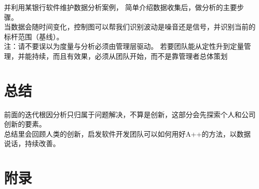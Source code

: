 \documentclass{book}        %
\begin{document}
并利用某银行软件维护数据分析案例， 简单介绍数据收集后，做分析的主要步骤。\\

当数据会随时间变化，控制图可以帮我们识别波动是噪音还是信号，并识别当前的标杆范围（基线）。\\

注：请不要误以为度量与分析必须由管理层驱动。 若要团队能从定性升到定量管理，并能持续，而且有效果，必须从团队开始，而不是靠管理者总体策划 \\










\part{总结} 前面的迭代根因分析只归属于问题解决，不算是创新，这部分会先探索个人和公司创新的要素。\\
总结里会回顾人类的创新，启发软件开发团队可以如何用好A++的方法，以数据说话，持续改善。\\





\part{附录}




\end{document}
